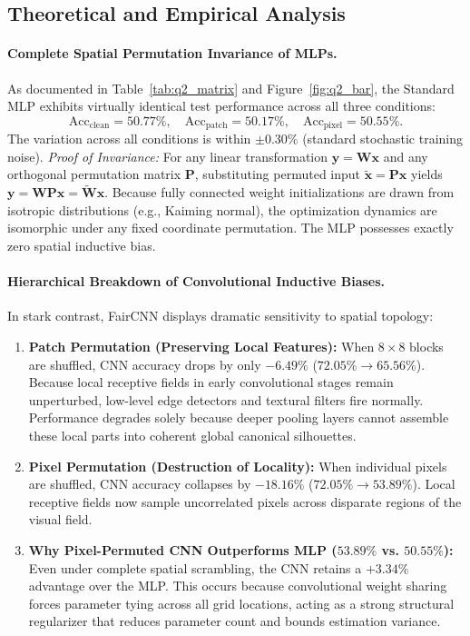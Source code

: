 \subsection{Theoretical and Empirical Analysis}
\paragraph{Complete Spatial Permutation Invariance of MLPs.}
As documented in Table~\ref{tab:q2_matrix} and Figure~\ref{fig:q2_bar}, the Standard MLP exhibits virtually identical test performance across all three conditions:
\begin{equation}
    \text{Acc}_{\text{clean}} = 50.77\%, \quad \text{Acc}_{\text{patch}} = 50.17\%, \quad \text{Acc}_{\text{pixel}} = 50.55\%.
\end{equation}
The variation across all conditions is within $\pm 0.30\%$ (standard stochastic training noise). 
\textit{Proof of Invariance:} For any linear transformation $\mathbf{y} = \mathbf{W}\mathbf{x}$ and any orthogonal permutation matrix $\mathbf{P}$, substituting permuted input $\tilde{\mathbf{x}} = \mathbf{P}\mathbf{x}$ yields $\mathbf{y} = \mathbf{W}\mathbf{P}\mathbf{x} = \tilde{\mathbf{W}}\mathbf{x}$. Because fully connected weight initializations are drawn from isotropic distributions (e.g., Kaiming normal), the optimization dynamics are isomorphic under any fixed coordinate permutation. The MLP possesses exactly zero spatial inductive bias.

\paragraph{Hierarchical Breakdown of Convolutional Inductive Biases.}
In stark contrast, FairCNN displays dramatic sensitivity to spatial topology:
\begin{enumerate}
    \item \textbf{Patch Permutation (Preserving Local Features):} When $8 \times 8$ blocks are shuffled, CNN accuracy drops by only $-6.49\%$ ($72.05\% \to 65.56\%$). Because local receptive fields in early convolutional stages remain unperturbed, low-level edge detectors and textural filters fire normally. Performance degrades solely because deeper pooling layers cannot assemble these local parts into coherent global canonical silhouettes.
    \item \textbf{Pixel Permutation (Destruction of Locality):} When individual pixels are shuffled, CNN accuracy collapses by $-18.16\%$ ($72.05\% \to 53.89\%$). Local receptive fields now sample uncorrelated pixels across disparate regions of the visual field.
    \item \textbf{Why Pixel-Permuted CNN Outperforms MLP ($53.89\%$ vs. $50.55\%$):} Even under complete spatial scrambling, the CNN retains a $+3.34\%$ advantage over the MLP. This occurs because convolutional weight sharing forces parameter tying across all grid locations, acting as a strong structural regularizer that reduces parameter count and bounds estimation variance.
\end{enumerate}

